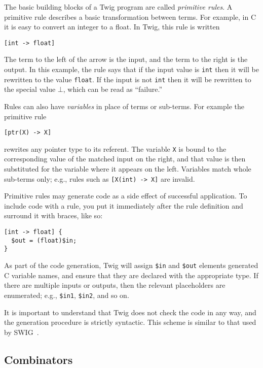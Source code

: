 The basic building blocks of a Twig program are called \emph{primitive rules}. A
primitive rule describes a basic transformation between terms. For example, in C
it is easy to convert an integer to a float. In Twig, this rule is written

\begin{verbatim}
[int -> float]
\end{verbatim}

The term to the left of the arrow is the input, and the term to the right is
the output. In this example, the rule says that if the input value is
\texttt{int} then it will be rewritten to the value \texttt{float}. If the
input is not \texttt{int} then it will be rewritten to the special value
$\bot$, which can be read as ``failure.''

Rules can also have \emph{variables} in place of terms or sub-terms. For
example the primitive rule

\begin{verbatim}
[ptr(X) -> X]
\end{verbatim}

rewrites any pointer type to its referent. The variable \texttt{X} is bound to
the corresponding value of the matched input on the right, and that value is
then substituted for the variable where it appears on the left. Variables
match whole sub-terms only; e.g., rules such as \texttt{[X(int) -> X]} are
invalid.

Primitive rules may generate code as a side effect of successful application. To
include code with a rule, you put it immediately after the rule definition and
surround it with braces, like so:

\begin{verbatim}
[int -> float] {
  $out = (float)$in;
}
\end{verbatim}

As part of the code generation, Twig will assign \texttt{\$in} and
\texttt{\$out} elements generated C variable names, and ensure that they are
declared with the appropriate type. If there are multiple inputs or outputs,
then the relevant placeholders are enumerated; e.g., \texttt{\$in1},
\texttt{\$in2}, and so on.

It is important to understand that Twig does not check the code in any way, and
the generation procedure is strictly syntactic. This scheme is similar to that
used by SWIG~\cite{swig}.

\subsection{Combinators}

